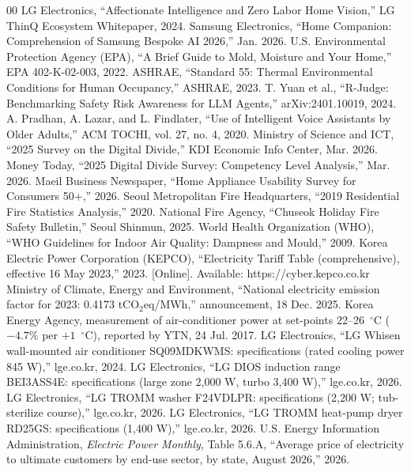 \documentclass[conference]{IEEEtran}
\begin{document}
\begin{thebibliography}{00}
 LG Electronics, ``Affectionate Intelligence and Zero Labor Home Vision,'' LG ThinQ Ecosystem Whitepaper, 2024.
 Samsung Electronics, ``Home Companion: Comprehension of Samsung Bespoke AI 2026,'' Jan. 2026.
 U.S. Environmental Protection Agency (EPA), ``A Brief Guide to Mold, Moisture and Your Home,'' EPA 402-K-02-003, 2022.
 ASHRAE, ``Standard 55: Thermal Environmental Conditions for Human Occupancy,'' ASHRAE, 2023.
 T. Yuan et al., ``R-Judge: Benchmarking Safety Risk Awareness for LLM Agents,'' arXiv:2401.10019, 2024.
 A. Pradhan, A. Lazar, and L. Findlater, ``Use of Intelligent Voice Assistants by Older Adults,'' ACM TOCHI, vol. 27, no. 4, 2020.
 Ministry of Science and ICT, ``2025 Survey on the Digital Divide,'' KDI Economic Info Center, Mar. 2026.
 Money Today, ``2025 Digital Divide Survey: Competency Level Analysis,'' Mar. 2026.
 Maeil Business Newspaper, ``Home Appliance Usability Survey for Consumers 50+,'' 2026.
 Seoul Metropolitan Fire Headquarters, ``2019 Residential Fire Statistics Analysis,'' 2020.
 National Fire Agency, ``Chuseok Holiday Fire Safety Bulletin,'' Seoul Shinmun, 2025.
 World Health Organization (WHO), ``WHO Guidelines for Indoor Air Quality: Dampness and Mould,'' 2009.
 Korea Electric Power Corporation (KEPCO), ``Electricity Tariff Table (comprehensive), effective 16 May 2023,'' 2023. [Online]. Available: https://cyber.kepco.co.kr
 Ministry of Climate, Energy and Environment, ``National electricity emission factor for 2023: 0.4173 tCO$_2$eq/MWh,'' announcement, 18 Dec. 2025.
 Korea Energy Agency, measurement of air-conditioner power at set-points 22--26~$^\circ$C ($-4.7$\% per $+1$~$^\circ$C), reported by YTN, 24 Jul. 2017.
 LG Electronics, ``LG Whisen wall-mounted air conditioner SQ09MDKWMS: specifications (rated cooling power 845 W),'' lge.co.kr, 2024.
 LG Electronics, ``LG DIOS induction range BEI3ASS4E: specifications (large zone 2,000 W, turbo 3,400 W),'' lge.co.kr, 2026.
 LG Electronics, ``LG TROMM washer F24VDLPR: specifications (2,200 W; tub-sterilize course),'' lge.co.kr, 2026.
 LG Electronics, ``LG TROMM heat-pump dryer RD25GS: specifications (1,400 W),'' lge.co.kr, 2026.
 U.S. Energy Information Administration, \emph{Electric Power Monthly}, Table 5.6.A, ``Average price of electricity to ultimate customers by end-use sector, by state, August 2026,'' 2026.

\end{thebibliography}
\end{document}
